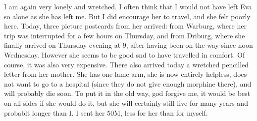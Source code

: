 
I am again very lonely and wretched. I often think that I would not have left Eva so alone as she has left me. But I did encourage her to travel, and she felt poorly here. Today, three picture postcards from her arrived: from Warburg, where her trip was interrupted for a few hours on Thursday, and from Driburg, where she finally arrived on Thursday evening at 9, after having been on the way since noon Wednesday. However she seems to be good snd to have travelled in comfort. Of course, it was also very expensive. There also arrived today a wretched pencilled letter from her mother. She has one lame arm, she is now entirely helpless, does not want to go to a hospital (since they do not give enough morphine there), and will probably die soon. To put it in the old way, god forgive me, it would be best on all sides if she would do it, but she will certainly still live for many years and probablt longer than I. I sent her 50M, less for her than for myself. \missing

